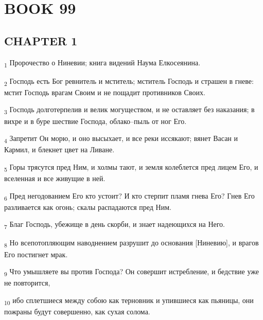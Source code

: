 \section{BOOK 99}
\subsection{CHAPTER 1}
\begin{tcolorbox}
\textsubscript{1} Пророчество о Ниневии; книга видений Наума Елкосеянина.
\end{tcolorbox}
\begin{tcolorbox}
\textsubscript{2} Господь есть Бог ревнитель и мститель; мститель Господь и страшен в гневе: мстит Господь врагам Своим и не пощадит противников Своих.
\end{tcolorbox}
\begin{tcolorbox}
\textsubscript{3} Господь долготерпелив и велик могуществом, и не оставляет без наказания; в вихре и в буре шествие Господа, облако--пыль от ног Его.
\end{tcolorbox}
\begin{tcolorbox}
\textsubscript{4} Запретит Он морю, и оно высыхает, и все реки иссякают; вянет Васан и Кармил, и блекнет цвет на Ливане.
\end{tcolorbox}
\begin{tcolorbox}
\textsubscript{5} Горы трясутся пред Ним, и холмы тают, и земля колеблется пред лицем Его, и вселенная и все живущие в ней.
\end{tcolorbox}
\begin{tcolorbox}
\textsubscript{6} Пред негодованием Его кто устоит? И кто стерпит пламя гнева Его? Гнев Его разливается как огонь; скалы распадаются пред Ним.
\end{tcolorbox}
\begin{tcolorbox}
\textsubscript{7} Благ Господь, убежище в день скорби, и знает надеющихся на Него.
\end{tcolorbox}
\begin{tcolorbox}
\textsubscript{8} Но всепотопляющим наводнением разрушит до основания [Ниневию], и врагов Его постигнет мрак.
\end{tcolorbox}
\begin{tcolorbox}
\textsubscript{9} Что умышляете вы против Господа? Он совершит истребление, и бедствие уже не повторится,
\end{tcolorbox}
\begin{tcolorbox}
\textsubscript{10} ибо сплетшиеся между собою как терновник и упившиеся как пьяницы, они пожраны будут совершенно, как сухая солома.
\end{tcolorbox}
